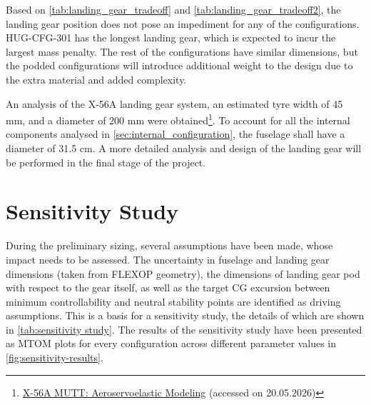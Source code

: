 Based on \autoref{tab:landing_gear_tradeoff} and \autoref{tab:landing_gear_tradeoff2}, the landing gear position does not pose an impediment for any of the configurations. HUG-CFG-301 has the longest landing gear, which is expected to incur the largest mass penalty. The rest of the configurations have similar dimensions, but the podded configurations will introduce additional weight to the design due to the extra material and added complexity.%

An analysis of the X-56A landing gear system, an estimated tyre width of 45 mm, and a diameter of 200 mm were obtained\footnote{\href{https://ntrs.nasa.gov/citations/20150023568}{X-56A MUTT: Aeroservoelastic Modeling} (accessed on 20.05.2026)}. To account for all the internal components analysed in \autoref{sec:internal_configuration}, the fuselage shall have a diameter of 31.5 cm. A more detailed analysis and design of the landing gear will be performed in the final stage of the project.





\section{Sensitivity Study}
\label{sec: sensitivity study}
During the preliminary sizing, several assumptions have been made, whose impact needs to be assessed. The uncertainty in fuselage and landing gear dimensions (taken from FLEXOP geometry), the dimensions of landing gear pod with respect to the gear itself, as well as the target CG excursion between minimum controllability and neutral stability points are identified as driving assumptions. This is a basis for a sensitivity study, the details of which are shown in \autoref{tab:sensitivity study}. The results of the sensitivity study have been presented as MTOM plots for every configuration across different parameter values in \autoref{fig:sensitivity-results}.

